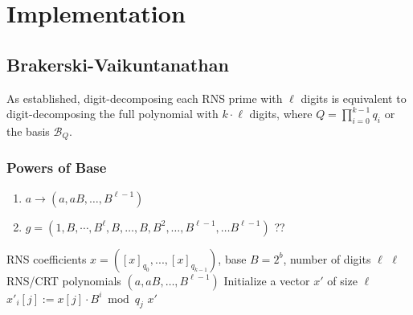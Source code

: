     


\newpage
\chapter{Implementation}
\section{Brakerski-Vaikuntanathan}
As established, digit-decomposing each RNS prime with $\ell$ digits is equivalent to digit-decomposing the full polynomial with $k\cdot\ell$ digits, where $Q = \prod_{i=0}^{k-1}q_i$ or the basis $\mathcal{B}_{Q}$.

\subsection{Powers of Base}
\begin{enumerate}
    \item $a \to (a, aB, \dots, B^{\ell-1})$
    \item $g = (1, B, \cdots, B^{\ell}, B, \dots, B, B^2, \dots, B^{\ell-1}, \dots B^{\ell-1})$ ??
\end{enumerate}

\begin{algorithm}
\caption{Powers of Base (Optimized)}
\label{alg:bv:p}
\begin{algorithmic}[1]
\Require RNS coefficients $x = ([x]_{q_0}, ..., [x]_{q_{k-1}})$, base $B = 2^{b}$, number of digits $\ell$
\Ensure $\ell$ RNS/CRT polynomials $(a, aB, \dots, B^{\ell-1})$
\State Initialize a vector $x'$ of size $\ell$
\For{$i \in [0, \ell)$ \textbf{in parallel}}
    \For{$j \in [0, k)$}
        \State $x'_i[j] := x[j] \cdot B^{i} \bmod{q_j}$
    \EndFor
\EndFor
\State \Return $x'$
\end{algorithmic}
\end{algorithm}

